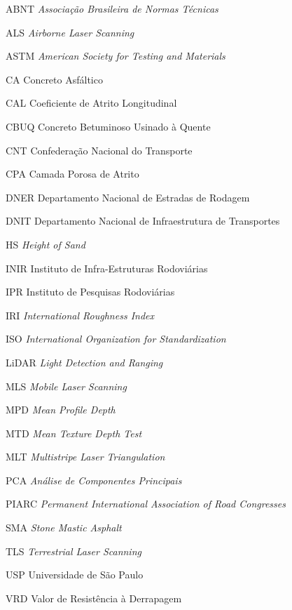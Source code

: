 \documentclass[
        12pt,
        openany, %
        oneside, %
        a4paper,			
        english,			
        brazil			        %
        abntfigtabnum     
        ]{abntbibifspcampinas}
\begin{document}
\begin{siglas} %
\item[{ABNT}]\emph{Associação Brasileira de Normas Técnicas}%
\item[{ALS}]\emph{Airborne Laser Scanning} %
\item[{ASTM}]\emph{American Society for Testing and Materials}%
\item[{CA}] Concreto Asfáltico%
\item[{CAL}] Coeficiente de Atrito Longitudinal%
\item[{CBUQ}] Concreto Betuminoso Usinado à Quente%
\item[{CNT}] Confederação Nacional do Transporte%
\item[{CPA}] Camada Porosa de Atrito%
\item[{DNER}] Departamento Nacional de Estradas de Rodagem%
\item[{DNIT}] Departamento Nacional de Infraestrutura de Transportes%
\item[{HS}] \emph{Height of Sand}%
\item[{INIR}] Instituto de Infra-Estruturas Rodoviárias%
\item[{IPR}] Instituto de Pesquisas Rodoviárias%
\item[{IRI}]\emph{International Roughness Index}%
\item[{ISO}]\emph{International Organization for Standardization}%
\item[{LiDAR}]\emph{Light Detection and Ranging}%
\item[{MLS}]\emph{Mobile Laser Scanning}%
\item[{MPD}]\emph{Mean Profile Depth}%
\item[{MTD}]\emph{Mean Texture Depth Test}%
\item[{MLT}]\emph{Multistripe Laser Triangulation}%
\item[{PCA}]\emph{Análise de Componentes Principais}%
\item[{PIARC}]\emph{Permanent International Association of Road Congresses}%
\item[{SMA}]\emph{Stone Mastic Asphalt}%
\item[{TLS}]\emph{Terrestrial Laser Scanning}%
\item[{USP}] Universidade de São Paulo%
\item[{VRD}] Valor de Resistência à Derrapagem%
\end{siglas}
\end{document}
